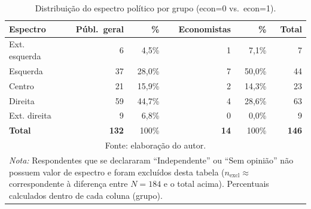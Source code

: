 \begin{table}[htbp]
\centering
\SingleSpacing
\caption{Distribuição do espectro político por grupo (econ=0 vs.\ econ=1).}
\label{tab:crosstab_econ_esp}
\footnotesize
\begin{tabular}{lrrrrr}
\toprule
\textbf{Espectro} & \textbf{Públ.\ geral} & \textbf{\%} & \textbf{Economistas} & \textbf{\%} & \textbf{Total} \\
\midrule
Ext. esquerda & 6 & 4,5\% & 1 & 7,1\% & 7 \\
Esquerda & 37 & 28,0\% & 7 & 50,0\% & 44 \\
Centro & 21 & 15,9\% & 2 & 14,3\% & 23 \\
Direita & 59 & 44,7\% & 4 & 28,6\% & 63 \\
Ext. direita & 9 & 6,8\% & 0 & 0,0\% & 9 \\
\midrule
\textbf{Total} & \textbf{132} & 100\% & \textbf{14} & 100\% & \textbf{146} \\
\bottomrule
\multicolumn{6}{c}{\footnotesize Fonte: elaboração do autor.} \\
\multicolumn{6}{p{11cm}}{\footnotesize \textit{Nota:} Respondentes que se declararam ``Independente'' ou ``Sem opinião'' não possuem valor de espectro e foram excluídos desta tabela ($n_{\text{excl}} \approx$ correspondente à diferença entre $N=184$ e o total acima). Percentuais calculados dentro de cada coluna (grupo).} \\
\end{tabular}
\end{table}